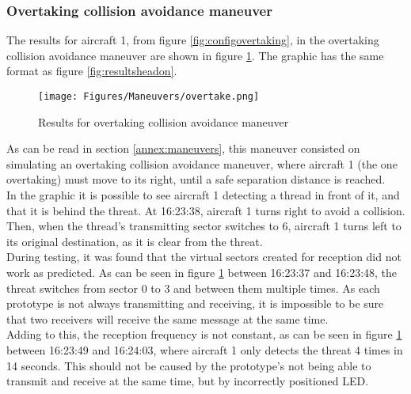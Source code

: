 \subsubsection{Overtaking collision avoidance maneuver}
The results for aircraft 1, from figure \ref{fig:configovertaking}, in the overtaking collision avoidance maneuver are shown in figure \ref{fig:resultsovertake}. The graphic has the same format as figure \ref{fig:resultsheadon}.\\

\begin{figure}[!ht]
  \centering
  \texttt{[image: Figures/Maneuvers/overtake.png]}
  \caption[Results for Overtaking Collision Avoidance Maneuver]{Results for overtaking collision avoidance maneuver}
  \label{fig:resultsovertake}
\end{figure}

As can be read in section \ref{annex:maneuvers}, this maneuver consisted on simulating an overtaking collision avoidance maneuver, where aircraft 1 (the one overtaking) must move to its right, until a safe separation distance is reached.\\
In the graphic it is possible to see aircraft 1 detecting a thread in front of it, and that it is behind the threat. At 16:23:38, aircraft 1 turns right to avoid a collision. Then, when the thread's transmitting sector switches to 6, aircraft 1 turns left to its original destination, as it is clear from the threat.\\

During testing, it was found that the virtual sectors created for reception did not work as predicted. As can be seen in figure \ref{fig:resultsovertake} between 16:23:37 and 16:23:48, the threat switches from sector 0 to 3 and between them multiple times. As each prototype is not always transmitting and receiving, it is impossible to be sure that two receivers will receive the same message at the same time. \\
Adding to this, the reception frequency is not constant, as can be seen in figure \ref{fig:resultsovertake} between 16:23:49 and 16:24:03, where aircraft 1 only detects the threat 4 times in 14 seconds. This should not be caused by the prototype's not being able to transmit and receive at the same time, but by incorrectly positioned LED.\\

